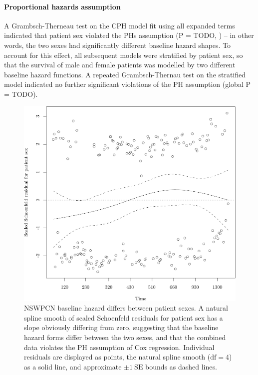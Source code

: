 \documentclass[dissertation.tex]{subfiles}
\begin{document}
\paragraph{Proportional hazards assumption}
A Grambsch-Therneau test \cite{Grambsch1994} on the \gls{CPH} model fit using all expanded terms indicated that patient sex violated the \glspl{PH} assumption (P = TODO, ) -- in other words, the two sexes had significantly different baseline hazard shapes.  To account for this effect, all subsequent models were stratified by patient sex, so that the survival of male and female patients was modelled by two different baseline hazard functions.  A repeated Grambsch-Thernau test on the stratified model indicated no further significant violations of the \gls{PH} assumption (global P = TODO).

\begin{figure}
\centering
  \includegraphics[width=.7\linewidth]{analysis/nomogram/figure/05-eda-ph-check-full-sexplot-1}
  \caption[Baseline hazard forms differ between patient sexes]{NSWPCN baseline hazard differs between patient sexes.  A natural spline smooth of scaled Schoenfeld residuals for patient sex has a slope obviously differing from zero, suggesting that the baseline hazard forms differ between the two sexes, and that the combined data violates the \acrshort{PH} assumption of Cox regression.  Individual residuals are displayed as points, the natural spline smooth ($\mbox{df}=4$) as a solid line, and approximate $\pm 1\ \mbox{SE}$ bounds as dashed lines.}
\label{fig:nomo-ph-plot-sex}
\end{figure}
\end{document}
